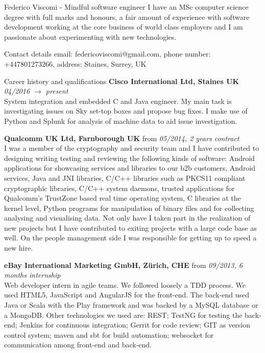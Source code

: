 \documentclass{resume}
\begin{document}
	\begin{rSection}{Federico Viscomi - Mindful software engineer}
		I have an MSc computer science degree with full marks and honours, 
		a fair amount of experience with software development working at the core business of world class employers 
		and I am passionate about experimenting with new technologies.

	\end{rSection}
	\begin{rSection} {Contact details}
                email: federicoviscomi@gmail.com,
		phone number: +447801273266,
                address: Staines, Surrey, UK
	\end{rSection}
	\begin{rSection}{Career history and qualifications}
		{\bf Cisco International Ltd, Staines UK} \hfill {\em 04/2016 $\rightarrow$ present}\\
			System integration and embedded C and Java engineer. 
			My main task is investigating issues on Sky set-top boxes and propose bug fixes.
			I make use of Python and Splunk for analysis of machine data to aid issue investigation.

		{\bf Qualcomm UK Ltd, Farnborough UK} \hfill {from \em 05/2014, 2 years contract}\\
			I was a member of the cryptography and security team and I have contributed to designing writing testing and reviewing the following kinds of software:
			Android applications for showcasing services and libraries to our b2b customers,
			Android services, 
			Java and JNI libraries, 
			C/C++ libraries such as PKCS11 compliant cryptographic libraries,
			C/C++ system daemons,
			trusted applications for Qualcomm's TrustZone based real time operating system,
			C libraries at the kernel level,
			Python programs for manipulation of binary files and for collecting analysing and visualising data.	
			Not only have I taken part in the realization of new projects but I have contributed to exiting projects with a large code base as well.
			On the people management side I was responsible for getting up to speed a new hire.

		{\bf eBay International Marketing GmbH, Z\"urich, CHE} \hfill {from \em 09/2013, 6 months internship}\\
			Web developer intern in agile teams.
			We followed loosely a TDD process.
			We used HTML5, JavaScript and AngularJS for the front-end. 
			The back-end used Java or Scala with the Play framework and was backed by a MySQL database or a MongoDB. 
			Other technologies we used are: 
			REST; TestNG for testing the back-end; 
			Jenkins for continuous integration; 
			Gerrit for code review; 
			GIT as version control system; 
			maven and sbt for build automation;
			websocket for communication among front-end and back-end.	  
	    

\end{rSection}
\end{document}
